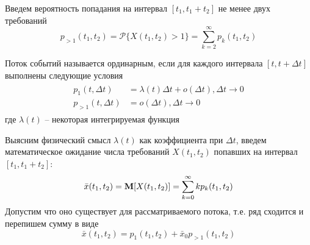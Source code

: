Введем вероятность попадания на интервал $[t_1, t_1 + t_2]$ не менее двух требований
$$p_{>1}(t_1, t_2) = \mathcal{P}\{X(t_1, t_2) > 1\} = \sum_{k=2}^{\infty}{p_k (t_1, t_2)}$$

\begin{definition}
	Поток событий называется {\color{red}ординарным}, если для каждого интервала $[t, t + \Delta t]$ выполнены следующие условия
	\begin{align}\label{eq:4}
	\begin{split}
		p_1 (t, \Delta t) &= \lambda(t) \Delta t + o(\Delta t), \Delta t \to 0 \\
		p_{>1}(t, \Delta t) &= o(\Delta t), \Delta t \to 0
	\end{split}
	\end{align}
	где $\lambda(t)$ -- некоторая интегрируемая функция
\end{definition}

Выясним физический смысл $\lambda(t)$ как коэффициента при $\Delta t$, введем математическое ожидание числа требований $X(t_1, t_2)$ попавших на интервал $[t_1, t_1 + t_2]$:
$$\bar{x}(t_1, t_2) = \mathbf{M}[X(t_1, t_2)] = \sum_{k=0}^{\infty}{k p_k (t_1, t_2)}$$
Допустим что оно существует для рассматриваемого потока, т.е. ряд сходится и перепишем сумму в виде
\begin{equation}\label{eq:1}
	\bar{x}(t_1, t_2) = p_1 (t_1, t_2) + \bar{x}_0 p_{>1} (t_1, t_2)
\end{equation}

